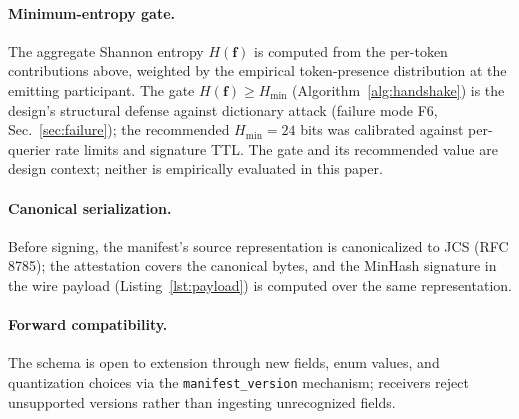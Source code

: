 \documentclass[11pt]{article}
\begin{document}
\paragraph{Minimum-entropy gate.} The aggregate Shannon entropy $H(\mathbf{f})$ is computed from the per-token contributions above, weighted by the empirical token-presence distribution at the emitting participant. The gate $H(\mathbf{f}) \geq H_{\min}$ (Algorithm~\ref{alg:handshake}) is the design's structural defense against dictionary attack (failure mode F6, Sec.~\ref{sec:failure}); the recommended $H_{\min} = 24$ bits was calibrated against per-querier rate limits and signature TTL. The gate and its recommended value are design context; neither is empirically evaluated in this paper.

\paragraph{Canonical serialization.} Before signing, the manifest's source representation is canonicalized to JCS (RFC 8785); the attestation covers the canonical bytes, and the MinHash signature in the wire payload (Listing~\ref{lst:payload}) is computed over the same representation.

\paragraph{Forward compatibility.} The schema is open to extension through new fields, enum values, and quantization choices via the \texttt{manifest\_version} mechanism; receivers reject unsupported versions rather than ingesting unrecognized fields.
\end{document}
